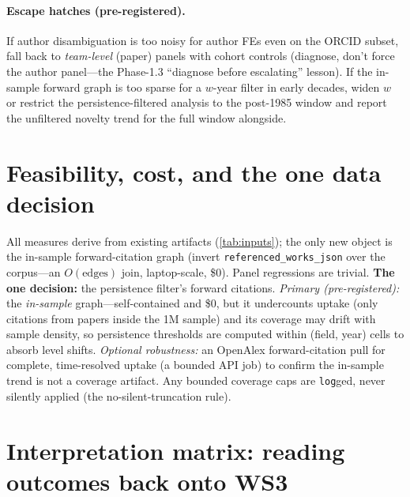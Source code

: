 \documentclass[11pt,letterpaper]{article}
\theoremstyle{definition}
\theoremstyle{plain}
\begin{document}
\paragraph{Escape hatches (pre-registered).} If author disambiguation is too
noisy for author FEs even on the ORCID subset, fall back to \emph{team-level}
(paper) panels with cohort controls (diagnose, don't force the author panel---the
Phase-1.3 ``diagnose before escalating'' lesson). If the in-sample forward graph
is too sparse for a $w$-year filter in early decades, widen $w$ or restrict the
persistence-filtered analysis to the post-1985 window and report the unfiltered
novelty trend for the full window alongside.

\section{Feasibility, cost, and the one data decision}\label{sec:feasibility}

All measures derive from existing artifacts (\cref{tab:inputs}); the only new
object is the in-sample forward-citation graph (invert
\texttt{referenced\_works\_json} over the corpus---an $O(\text{edges})$ join,
laptop-scale, \$0). Panel regressions are trivial. \textbf{The one decision:} the
persistence filter's forward citations. \emph{Primary (pre-registered):} the
\emph{in-sample} graph---self-contained and \$0, but it undercounts uptake
(only citations from papers inside the 1M sample) and its coverage may drift with
sample density, so persistence thresholds are computed within (field, year) cells
to absorb level shifts. \emph{Optional robustness:} an OpenAlex forward-citation
pull for complete, time-resolved uptake (a bounded API job) to confirm the
in-sample trend is not a coverage artifact. Any bounded coverage caps are
\texttt{log}ged, never silently applied (the no-silent-truncation rule).

\section{Interpretation matrix: reading outcomes back onto WS3}
\end{document}
